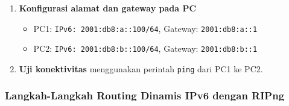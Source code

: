 \begin{enumerate}
    \item \textbf{Konfigurasi alamat dan gateway pada PC}
    \begin{itemize}
        \item PC1: \texttt{IPv6: 2001:db8:a::100/64}, Gateway: \texttt{2001:db8:a::1}
        \item PC2: \texttt{IPv6: 2001:db8:b::100/64}, Gateway: \texttt{2001:db8:b::1}
    \end{itemize}

    \item \textbf{Uji konektivitas} menggunakan perintah \texttt{ping} dari PC1 ke PC2.
\end{enumerate}

\subsubsection{Langkah-Langkah Routing Dinamis IPv6 dengan RIPng}

